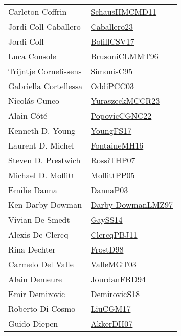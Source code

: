 {\begin{longtable}{p{4cm}p{20cm}}
Carleton Coffrin & \href{articles/SchausHMCMD11.pdf}{SchausHMCMD11}\cite{SchausHMCMD11} \\
Jordi Coll Caballero & \href{articles/Caballero23.pdf}{Caballero23}\cite{Caballero23} \\
Jordi Coll & \href{papers/BofillCSV17.pdf}{BofillCSV17}\cite{BofillCSV17} \\
Luca Console & \href{papers/BrusoniCLMMT96.pdf}{BrusoniCLMMT96}\cite{BrusoniCLMMT96} \\
Trijntje Cornelissens & \href{papers/SimonisC95.pdf}{SimonisC95}\cite{SimonisC95} \\
Gabriella Cortellessa & \href{papers/OddiPCC03.pdf}{OddiPCC03}\cite{OddiPCC03} \\
Nicol{\'{a}}s Cuneo & \href{articles/YuraszeckMCCR23.pdf}{YuraszeckMCCR23}\cite{YuraszeckMCCR23} \\
Alain C{\^{o}}t{\'{e}} & \href{papers/PopovicCGNC22.pdf}{PopovicCGNC22}\cite{PopovicCGNC22} \\
Kenneth D. Young & \href{papers/YoungFS17.pdf}{YoungFS17}\cite{YoungFS17} \\
Laurent D. Michel & \href{papers/FontaineMH16.pdf}{FontaineMH16}\cite{FontaineMH16} \\
Steven D. Prestwich & \href{papers/RossiTHP07.pdf}{RossiTHP07}\cite{RossiTHP07} \\
Michael D. Moffitt & \href{papers/MoffittPP05.pdf}{MoffittPP05}\cite{MoffittPP05} \\
Emilie Danna & \href{papers/DannaP03.pdf}{DannaP03}\cite{DannaP03} \\
Ken Darby{-}Dowman & \href{articles/Darby-DowmanLMZ97.pdf}{Darby-DowmanLMZ97}\cite{Darby-DowmanLMZ97} \\
Vivian De Smedt & \href{papers/GaySS14.pdf}{GaySS14}\cite{GaySS14} \\
Alexis De Clercq & \href{papers/ClercqPBJ11.pdf}{ClercqPBJ11}\cite{ClercqPBJ11} \\
Rina Dechter & \href{papers/FrostD98.pdf}{FrostD98}\cite{FrostD98} \\
Carmelo Del Valle & \href{papers/ValleMGT03.pdf}{ValleMGT03}\cite{ValleMGT03} \\
Alain Demeure & \href{}{JourdanFRD94}\cite{JourdanFRD94} \\
Emir Demirovic & \href{papers/DemirovicS18.pdf}{DemirovicS18}\cite{DemirovicS18} \\
Roberto Di Cosmo & \href{papers/LiuCGM17.pdf}{LiuCGM17}\cite{LiuCGM17} \\
Guido Diepen & \href{papers/AkkerDH07.pdf}{AkkerDH07}\cite{AkkerDH07} \\

\end{longtable}}
